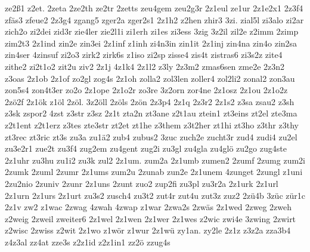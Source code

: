 {ze2ß1
z2et.
2zeta
2ze2th
ze2tr
2zetts
zeu4gem
zeu2g3r
2z1eul
ze1ur
2z1e2x1
2z3f4
zfäs3
zfeue2
2z3g4
zgang5
zger2a
zger2s1
2z1h2
z2hen
zhir3
3zi.
zial5l
zi3alo
zi2ar
zich2o
zi2dei
zid3r
zie4ler
zie2l1i
zi1erh
zi1es
zi3ess
3zig
3z2il
zil2e
z2imm
2zimp
zim2t3
2z1ind
zin2e
zin3ei
2z1inf
z1inh
zi4n3in
zin1it
2z1inj
zin4na
zin4o
zin2sa
zin4ser
4zinsuf
zi2o3
zirk2
zirk6s
z1iso
zi2sp
zisse4
zis4t
zistras6
zi3s2z
zite4
zithe2
zi2t1o2
zit2u
ziv2
2z1j
4z1k4
2z1l2
z3ly
2z3m2
zmas6sen
zme2e
2z3n2
z3oas
2z1ob
2z1of
zo2gl
zog4s
2z1oh
zolla2
zol3len
zoller4
zol2li2
zonal2
zon3au
zon5s4
zon4t3er
zo2o
2z1ope
2z1o2r
zo3re
3z2orn
zor4ne
2z1osz
2z1ou
2z1o2z
2zö2f
2z1ök
z1öl
2zöl.
3z2öll
2zöls
2zön
2z3p4
2z1q
2z3r2
2z1s2
z3sa
zsau2
z3sh
z3sk
zspor2
4zst
z3str
z3sz
2z1t
zta2n
zt3ane
z2t1au
ztein1
zt3eins
zt2el
zte3ma
z2t1ent
z2t1erz
z3tes
zte3str
zt2et
zt1he
z3them
z3t2her
zt1hi
zt3ho
z3thr
z3thy
zt3rec
zt3ric
zt3s
zu3a
zu1ä2
zub4
zubus2
3zuc
zuch2e
zucht3r
zud4
zudi4
zu2el
zu3e2r1
zue2t
zu3f4
zug2em
zu4gent
zug2i
zu3gl
zu4gla
zu4glö
zu2go
zug4ste
2z1uhr
zu3hu
zu1i2
zu3k
zul2
2z1um.
zum2a
2z1umb
zumen2
2zumf
2zumg
zum2i
2zumk
2zuml
2zumr
2z1ums
zum2u
2zunab
zun2e
2z1unem
4zunget
2zungl
z1uni
2zu2nio
2zuniv
2zunr
2z1uns
2zunt
zuo2
zup2fi
zu3pl
zu3r2a
2z1urk
2z1url
2z1urn
2z1urs
2z1urt
zu3s2
zusch4
zu3t2
zut4r
zut4u
zut3z
zuz2
2zü4b
3züc
zür1c
2z1v
zw2
z1wac
2zwag
4zwah
4zwap
z1war
2zwa2s
2zwäs
2z1wed
2zweg
2zweh
z2weig
2zweil
zweiter6
2z1wel
2z1wen
2z1wer
2z1wes
z2wic
zwi4e
3zwing
2zwirt
z2wisc
2zwiss
z2wit
2z1wo
z1wör
z1wur
2z1wü
zy1an.
zy2le
2z1z
z3z2a
zza3b4
z4z3al
zz4at
zze3s
z2z1id
z2z1in1
zz2ö
zzug4s
}

\endinput

